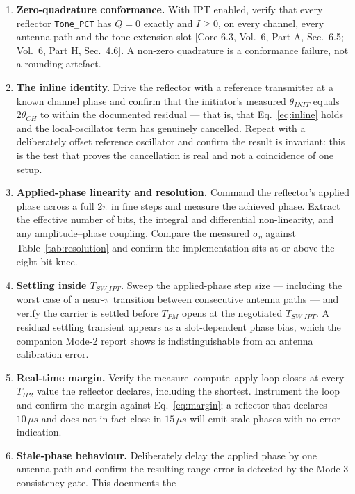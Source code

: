 \documentclass[11pt,a4paper]{article}
\newcommand{\us}{\,\ensuremath{\upmu}s}
\newcommand{\IPT}{\ensuremath{\mathrm{IPT}}}
\newcommand{\Tswipt}{T_{SW\_IPT}}
\newcommand{\Tpm}{T_{PM}}
\newcommand{\Tiptwo}{T_{IP2}}
\newcommand{\code}[1]{\texttt{\small #1}}
\providecommand{\upmu}{\mu}
\newcommand{\core}[1]{\textcolor{rulegrey}{\small[Core 6.3, #1]}}
\begin{document}
\begin{enumerate}[leftmargin=1.7em,itemsep=2pt]
  \item \textbf{Zero-quadrature conformance.} With \IPT{} enabled, verify that every reflector
    \code{Tone\_PCT} has $Q = 0$ exactly and $I \ge 0$, on every channel, every antenna path and the
    tone extension slot \core{Vol.\ 6, Part A, Sec.\ 6.5; Vol.\ 6, Part H, Sec.\ 4.6}. A non-zero
    quadrature is a conformance failure, not a rounding artefact.
  \item \textbf{The inline identity.} Drive the reflector with a reference transmitter at a known
    channel phase and confirm that the initiator's measured $\theta_{INIT}$ equals $2\theta_{CH}$ to
    within the documented residual --- that is, that Eq.~\eqref{eq:inline} holds and the
    local-oscillator term has genuinely cancelled. Repeat with a deliberately offset reference
    oscillator and confirm the result is invariant: this is the test that proves the cancellation is
    real and not a coincidence of one setup.
  \item \textbf{Applied-phase linearity and resolution.} Command the reflector's applied phase across
    a full $2\pi$ in fine steps and measure the achieved phase. Extract the effective number of bits,
    the integral and differential non-linearity, and any amplitude--phase coupling. Compare the
    measured $\sigma_\eta$ against Table~\ref{tab:resolution} and confirm the implementation sits at
    or above the eight-bit knee.
  \item \textbf{Settling inside $\Tswipt$.} Sweep the applied-phase step size --- including the
    worst case of a near-$\pi$ transition between consecutive antenna paths --- and verify the carrier
    is settled before $\Tpm$ opens at the negotiated $\Tswipt$. A residual settling transient appears
    as a slot-dependent phase bias, which the companion Mode-2 report shows is indistinguishable from
    an antenna calibration error.
  \item \textbf{Real-time margin.} Verify the measure--compute--apply loop closes at every
    $\Tiptwo$ value the reflector declares, including the shortest. Instrument the loop and confirm
    the margin against Eq.~\eqref{eq:margin}; a reflector that declares $10\us$ and does not in fact
    close in $15\us$ will emit stale phases with no error indication.
  \item \textbf{Stale-phase behaviour.} Deliberately delay the applied phase by one antenna path and
    confirm the resulting range error is detected by the Mode-3 consistency gate. This documents the

\end{enumerate}
\end{document}
